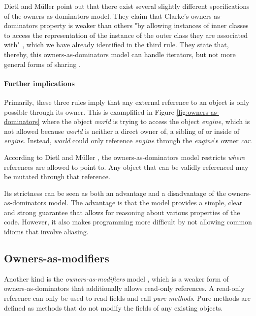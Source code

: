 \documentclass[sigplan,11pt,nonacm]{acmart}
\begin{document}
Dietl and Müller \cite{lightweight-ownership} point out that there exist several slightly different specifications of the owners-as-dominators model.
They claim that Clarke's owners-as-dominators property \cite{ownership-types-survey} is weaker than others "by allowing instances of inner classes to access the representation of the instance of the outer class they are associated with" \cite{lightweight-ownership}, which we have already identified in the third rule.
They state that, thereby, this owners-as-dominators model can handle iterators, but not more general forms of sharing \cite{lightweight-ownership}.


\paragraph{Further implications}

Primarily, these three rules imply that any external reference to an object is only possible through its owner.
This is examplified in Figure \ref{fig:owners-as-dominators} where the object \emph{world} is trying to access the object \emph{engine}, which is not allowed because \emph{world} is neither a direct owner of, a sibling of or inside of \emph{engine}.
Instead, \emph{world} could only reference \emph{engine} through the \emph{engine}'s owner \emph{car}.

According to Dietl and Müller \cite{lightweight-ownership}, the owners-as-dominators model restricts \emph{where} references are allowed to point to.
Any object that can be validly referenced may be mutated through that reference.

Its strictness can be seen as both an advantage and a disadvantage of the owners-as-dominators model.
The advantage is that the model provides a simple, clear and strong guarantee that allows for reasoning about various properties of the code.
However, it also makes programming more difficult by not allowing common idioms that involve aliasing. \cite{ownership-types-survey}


\subsection{Owners-as-modifiers}
\label{sec:owners-as-modifiers}

Another kind is the \emph{owners-as-modifiers} model \cite{ownership-types-survey}, which is a weaker form of owners-as-dominators that additionally allows read-only references.
A read-only reference can only be used to read fields and call \emph{pure methods}.
Pure methods are defined as methods that do not modify the fields of any existing objects. \cite{ownership-types-survey}
\end{document}
